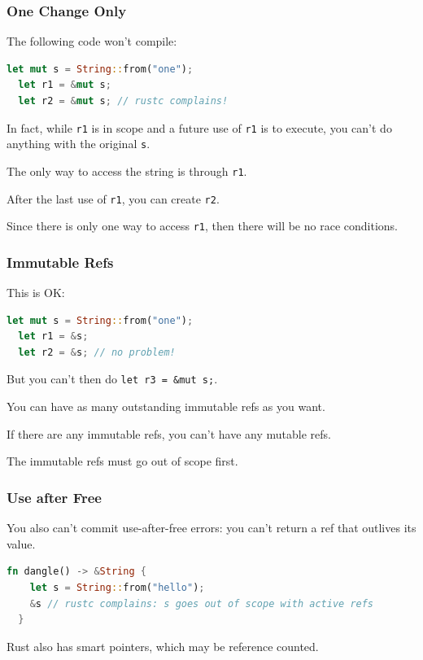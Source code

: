 \begin{frame}[fragile]
\frametitle{One Change Only}

The following code won't compile:
\begin{lstlisting}[language=Rust]
  let mut s = String::from("one");
  let r1 = &mut s;
  let r2 = &mut s; // rustc complains!
\end{lstlisting}
In fact, while {\tt r1} is in scope and a future use of {\tt r1} is to execute, you can't do anything with the original {\tt s}.

The only way to access the string is through {\tt r1}.

After the last use of {\tt r1}, you can create {\tt r2}.

Since there is only one way to access {\tt r1}, then there will be no race conditions.

\end{frame}

\begin{frame}[fragile]
\frametitle{Immutable Refs}

This is OK:
\begin{lstlisting}[language=Rust]
  let mut s = String::from("one");
  let r1 = &s;
  let r2 = &s; // no problem!
\end{lstlisting}
But you can't then do {\tt let r3 = \&mut s;}.

You can have as many outstanding immutable refs as you want.

If there are any immutable refs, you can't have \alert{any} mutable refs.

The immutable refs must go out of scope first.

\end{frame}


\begin{frame}[fragile]
\frametitle{Use after Free}

You also can't commit use-after-free errors: you can't return a ref that outlives
its value.
\begin{lstlisting}[language=Rust]
  fn dangle() -> &String {
    let s = String::from("hello");
    &s // rustc complains: s goes out of scope with active refs
  }
\end{lstlisting}

Rust also has \alert{smart pointers}, which may be reference counted. 

\end{frame}



